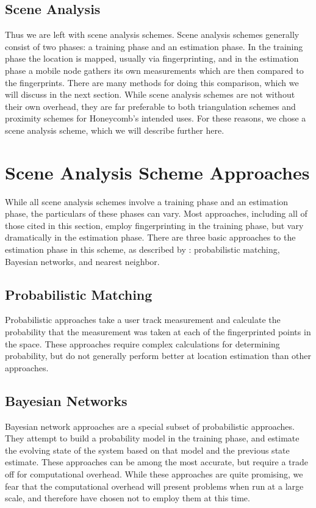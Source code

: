 \subsection{Scene Analysis} Thus we are left with scene analysis schemes. Scene analysis schemes generally consist of two phases: a training phase and an estimation phase. In the training phase the location is mapped, usually via fingerprinting, and in the estimation phase a mobile node gathers its own measurements which are then compared to the fingerprints. There are many methods for doing this comparison, which we will discuss in the next section. While scene analysis schemes are not without their own overhead, they are far preferable to both triangulation schemes and proximity schemes for Honeycomb's intended uses. For these reasons, we chose a scene analysis scheme, which we will describe further here.
	

\section{Scene Analysis Scheme Approaches}
%

While all scene analysis schemes involve a training phase and an estimation phase, the particulars of these phases can vary. Most approaches, including all of those cited in this section, employ fingerprinting in the training phase, but vary dramatically in the estimation phase. There are three basic approaches to the estimation phase in this scheme, as described by \cite{turner2011empirical}: probabilistic matching, Bayesian networks, and nearest neighbor. 

\subsection{Probabilistic Matching} Probabilistic approaches take a user track measurement and calculate the probability that the measurement was taken at each of the fingerprinted points in the space. These approaches require complex calculations for determining probability, but do not generally perform better at location estimation than other approaches\cite{hotta2012robust}.

\subsection{Bayesian Networks} Bayesian network approaches \cite{ito2005bayesian} \cite{seshadri2005bayesian} are a special subset of probabilistic approaches. They attempt to build a probability model in the training phase, and estimate the evolving state of the system based on that model and the previous state estimate. These approaches can be among the most accurate, but require a trade off for computational overhead. While these approaches are quite promising, we fear that the computational overhead will present problems when run at a large scale, and therefore have chosen not to employ them at this time. 


